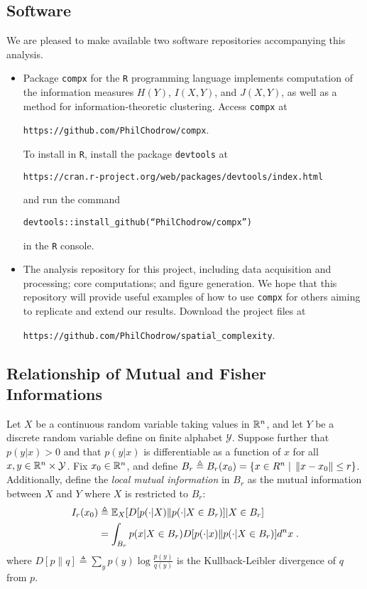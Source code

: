 
\subsection*{Software} 

  We are pleased to make available two software repositories accompanying this analysis. 
  \begin{itemize}
    \item Package \texttt{compx} for the \texttt{R} programming language implements computation of the information measures $H(Y)$, $I(X,Y)$, and $J(X,Y)$, as well as a method for information-theoretic clustering. Access \texttt{compx} at 
    \begin{displayquote}
      \texttt{https://github.com/PhilChodrow/compx}. 
    \end{displayquote}
    To install in \texttt{R}, install the package \texttt{devtools} at 
    \begin{displayquote}
    \texttt{https://cran.r-project.org/web/packages/devtools/index.html}
    \end{displayquote}
     and run the command 
    \begin{displayquote}
      \texttt{devtools::install\_github(``PhilChodrow/compx'')}
    \end{displayquote}
    in the \texttt{R} console. 
    \item The analysis repository for this project, including data acquisition and processing; core computations; and figure generation. We hope that this repository will provide useful examples of how to use \texttt{compx} for others aiming to replicate and extend our results. Download the project files at 
    \begin{displayquote}
      \texttt{https://github.com/PhilChodrow/spatial\_complexity}. 
    \end{displayquote}
  \end{itemize}

\subsection*{Relationship of Mutual and Fisher Informations}

	Let $X$ be a continuous random variable taking values in $\mathbb{R}^n$, and let $Y$ be a discrete random variable define on finite alphabet $\mathcal{Y}$. Suppose further that $p(y|x) > 0$ and that $p(y|x)$ is differentiable as a function of $x$ for all $x,y \in \mathbb{R}^n \times \mathcal{Y}$. Fix $x_0 \in \mathbb{R}^n$, and define $B_r \triangleq B_r(x_0) = \{ x \in R^n \;|\; \left\lVert x - x_0\right\rVert \leq r \}$. Additionally, define the \emph{local mutual information} in $B_r$ as the mutual information between $X$ and $Y$ where $X$ is restricted to $B_r$:
		\begin{align}
			I_r(x_0) &\triangleq \mathbb{E}_X[D[p(\cdot|X)\| p(\cdot|X \in B_r)]|X \in B_r] \\
			&= \int_{B_r} p(x|X \in B_r) D[p(\cdot|x)\| p(\cdot|X \in B_r)] d^n x\;.
		\end{align}
		where $D[p\|q] \triangleq \sum_{y} p(y) \log \frac{p(y)}{q(y)}$ is the Kullback-Leibler divergence of $q$ from $p$. 

